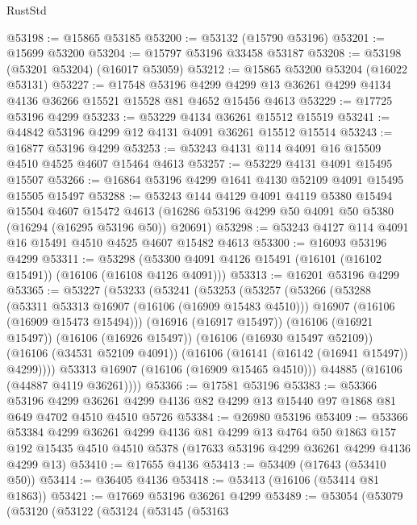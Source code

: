 \begin{lexlean}{RustStd}
\begin{coremodule}
@53198 := @15865 @53185
@53200 := @53132 (@15790 @53196)
@53201 := @15699 @53200
@53204 := @15797 @53196 @33458 @53187
@53208 := @53198 (@53201 @53204) (@16017 @53059)
@53212 := @15865 @53200 @53204 (@16022 @53131)
@53227 := @17548
    @53196
    @4299
    @4299
    @13
    @36261
    @4299
    @4134
    @4136
    @36266
    @15521
    @15528
    @81
    @4652
    @15456
    @4613
@53229 := @17725 @53196 @4299
@53233 := @53229 @4134 @36261 @15512 @15519
@53241 := @44842 @53196 @4299 @12 @4131 @4091 @36261 @15512 @15514
@53243 := @16877 @53196 @4299
@53253 := @53243 @4131 @114 @4091 @16 @15509 @4510 @4525 @4607 @15464 @4613
@53257 := @53229 @4131 @4091 @15495 @15507
@53266 := @16864 @53196 @4299 @1641 @4130 @52109 @4091 @15495 @15505 @15497
@53288 := @53243
    @144
    @4129
    @4091
    @4119
    @5380
    @15494
    @15504
    @4607
    @15472
    @4613
    (@16286 @53196 @4299 @50 @4091 @50 @5380 (@16294 (@16295 @53196 @50)) @20691)
@53298 := @53243 @4127 @114 @4091 @16 @15491 @4510 @4525 @4607 @15482 @4613
@53300 := @16093 @53196 @4299
@53311 := @53298 (@53300 @4091 @4126 @15491 (@16101 (@16102 @15491)) (@16106 (@16108 @4126 @4091)))
@53313 := @16201 @53196 @4299
@53365 := @53227
    (@53233
      (@53241
        (@53253
          (@53257
            (@53266
              (@53288
                (@53311 @53313 @16907 (@16106 (@16909 @15483 @4510)))
                @16907
                (@16106 (@16909 @15473 @15494)))
              (@16916 (@16917 @15497))
              (@16106 (@16921 @15497))
              (@16106 (@16926 @15497))
              (@16106 (@16930 @15497 @52109))
              (@16106 (@34531 @52109 @4091))
              (@16106 (@16141 (@16142 (@16941 @15497)) @4299))))
          @53313
          @16907
          (@16106 (@16909 @15465 @4510)))
        @44885
        (@16106 (@44887 @4119 @36261))))
@53366 := @17581 @53196
@53383 := @53366
    @53196
    @4299
    @36261
    @4299
    @4136
    @82
    @4299
    @13
    @15440
    @97
    @1868
    @81
    @649
    @4702
    @4510
    @4510
    @5726
@53384 := @26980 @53196
@53409 := @53366
    @53384
    @4299
    @36261
    @4299
    @4136
    @81
    @4299
    @13
    @4764
    @50
    @1863
    @157
    @192
    @15435
    @4510
    @4510
    @5378
    (@17633 @53196 @4299 @36261 @4299 @4136 @4299 @13)
@53410 := @17655 @4136
@53413 := @53409 (@17643 (@53410 @50))
@53414 := @36405 @4136
@53418 := @53413 (@16106 (@53414 @81 @1863))
@53421 := @17669 @53196 @36261 @4299
@53489 := @53054
    (@53079
      (@53120
        (@53122
          (@53124
            (@53145
              (@53163

\end{coremodule}
\end{lexlean}
